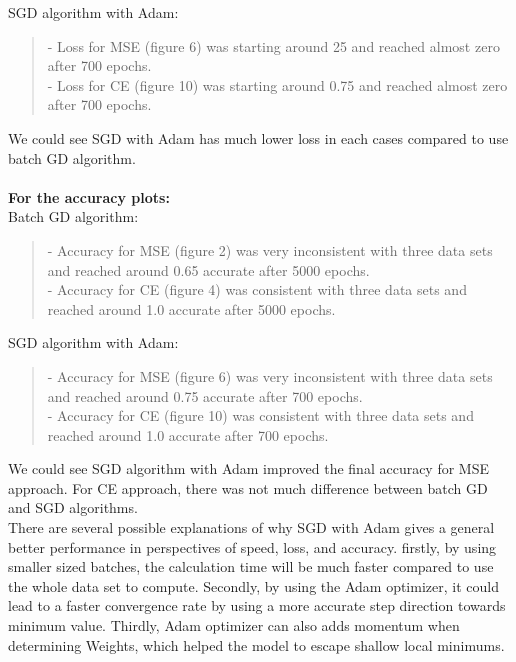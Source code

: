 \documentclass[10pt,letterpaper]{article}
\begin{document}
SGD algorithm with Adam:  
\begin{quote}
    - Loss for MSE (figure 6) was starting around 25 and reached almost zero after 700 epochs.\\
   - Loss for CE (figure 10) was starting around 0.75 and reached almost zero after 700 epochs.
\end{quote}


We could see SGD with Adam has much lower loss in each cases compared to use batch GD algorithm.\\
\\
\textbf{For the accuracy plots:}\\

Batch GD algorithm: 
\begin{quote}
- Accuracy for MSE (figure 2) was very inconsistent with three data sets and reached around 0.65 accurate after 5000 epochs. \\
- Accuracy for CE (figure 4) was consistent with three data sets and reached around 1.0 accurate after 5000 epochs.
\end{quote}


SGD algorithm with Adam:
\begin{quote}
    - Accuracy for MSE (figure 6) was very inconsistent with three data sets and reached around 0.75 accurate after 700 epochs.\\
- Accuracy for CE (figure 10) was consistent with three data sets and reached around 1.0 accurate after 700 epochs.
\end{quote}

We could see SGD algorithm with Adam improved the final accuracy for MSE approach. For CE approach, there was not much difference between batch GD and SGD algorithms.\\

There are several possible explanations of why SGD with Adam gives a general better performance in perspectives of speed, loss, and accuracy. firstly, by using smaller sized batches, the calculation time will be much faster compared to use the whole data set to compute. Secondly, by using the Adam optimizer, it could lead to a faster convergence rate by using a more accurate step direction towards minimum value. Thirdly, Adam optimizer can also adds momentum when determining Weights, which helped the model to escape shallow local minimums. 
\\
\medskip
\vspace{15mm}



\end{document}
